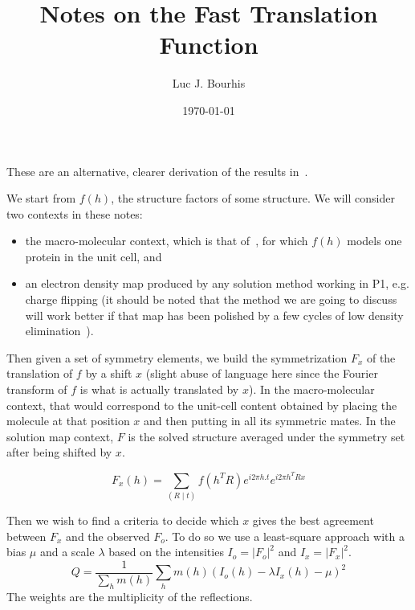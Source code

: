 \documentclass[11pt]{article}
\title{Notes on the Fast Translation Function}
\author{Luc J. Bourhis}
\date{\today}                                           %
\newcommand{\modulus}[1]{\left| #1 \right|}
\newcommand{\sym}[2]{\left( #1 \mid #2 \right)}
\begin{document}
\maketitle

These are an alternative, clearer derivation of the results in~\cite{J.Navaza:1995}.

We start from $f(h)$, the structure factors of some structure. We will consider two contexts in these notes:
\begin{itemize}
\item the macro-molecular context, which is that of~\cite{J.Navaza:1995}, for which $f(h)$ models one protein in the unit cell, and
\item an electron density map produced by any solution method working in P1, e.g. charge flipping (it should be noted that the method we are going to discuss will work better if that map has been polished by a few cycles of low density elimination~\cite{Shiono:1992}).
\end{itemize}

Then given a set of symmetry elements, we build the symmetrization $F_x$ of the translation of $f$ by a shift $x$ (slight abuse of language here since the Fourier transform of $f$ is what is actually translated by $x$). In the macro-molecular context, that would correspond to the unit-cell content obtained by placing the molecule at that position $x$ and then putting in all its symmetric mates. In the solution map context, $F$ is the solved structure averaged under the symmetry set after being shifted by $x$.

\begin{equation}
F_x(h) = \sum_{\sym{R}{t}} f(h^T R) e^{i2\pi h.t} e^{i2\pi h^T R x}
\end{equation}

Then we wish to find a criteria to decide which $x$ gives the best agreement between $F_x$ and the observed $F_o$. To do so we use a least-square approach with a bias $\mu$ and a scale $\lambda$ based on the intensities $I_o = \modulus{F_o}^2$ and $I_x = \modulus{F_x}^2$.
\begin{equation}
Q = \frac{1}{\sum_h m(h)} \sum_h m(h) \left(I_o(h) - \lambda I_x(h) - \mu\right)^2
\end{equation}
The weights are the multiplicity of the reflections.
\end{document}
